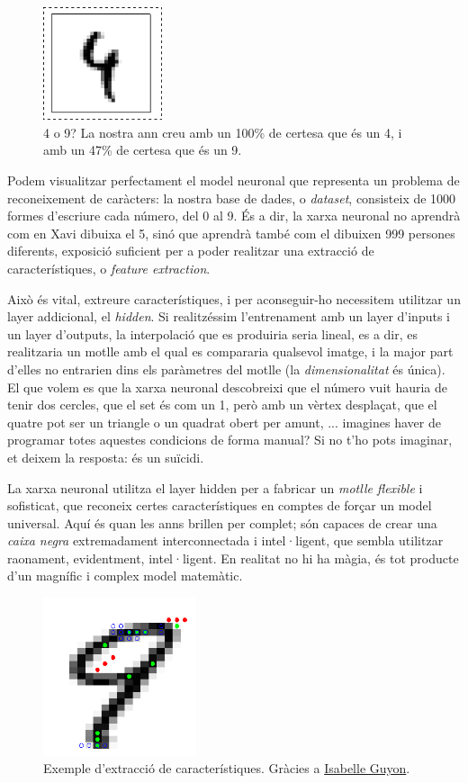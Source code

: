 \begin{figure}[ht!]
\centering
\includegraphics[width=35mm]{data/confusing_2.png}
\caption{4 o 9? La nostra \ac{ann} creu amb un 100\% de certesa que és un 4, i amb un 47\% de certesa que és un 9.}
\label{certesa}
\end{figure}

Podem visualitzar perfectament el model neuronal que representa un problema de reconeixement de caràcters: la nostra
base de dades, o \emph{dataset}, consisteix de 1000 formes d'escriure cada número, del 0 al 9. És a dir, la xarxa neuronal
no aprendrà com en Xavi dibuixa el 5, sinó que aprendrà també com el dibuixen 999 persones diferents, exposició suficient per
a poder realitzar una extracció de característiques, o \emph{feature extraction}.

Això és vital, extreure característiques, i per aconseguir-ho necessitem utilitzar un layer addicional, el \emph{hidden}. 
Si realitzéssim l'entrenament amb un layer d'inputs i un layer d'outputs, la interpolació que es produiria seria lineal,
es a dir, es realitzaria un motlle amb el qual es compararia qualsevol imatge, i la major part d'elles no entrarien dins
els paràmetres del motlle (la \emph{dimensionalitat} és única). El que volem es que la xarxa neuronal descobreixi que el número
vuit hauria de tenir dos cercles, que el set és com un 1, però amb un vèrtex desplaçat, que el quatre pot ser un triangle o un
quadrat obert per amunt, ... imagines haver de programar totes aquestes condicions de forma manual? Si no t'ho pots imaginar, 
et deixem la resposta: és un suïcidi.

La xarxa neuronal utilitza el layer hidden per a fabricar un \emph{motlle flexible} i sofisticat, que reconeix certes característiques
en comptes de forçar un model universal. Aquí és quan les \ac{ann}s brillen per complet; són capaces de crear una \emph{caixa negra}
extremadament interconnectada i intel·ligent, que sembla utilitzar raonament, evidentment, intel·ligent. En realitat no hi ha màgia, 
és tot producte d'un magnífic i complex model matemàtic.

\begin{figure}[ht!]
\centering
\includegraphics[width=45mm]{data/extraction-0.png}
\caption{Exemple d'extracció de característiques. Gràcies a \href{http://clopinet.com/isabelle/Projects/ETH/}{Isabelle Guyon}.}
\label{extracció}
\end{figure}

